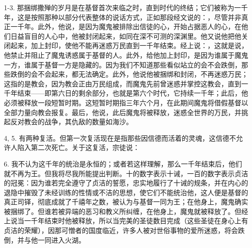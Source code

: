 1-3.  那捆绑撒殚的岁月是在基督首次来临之时，直到时代的终结；它们被称为一千年，这是按照那种以部分代表整体的说话方式，正如那段经文说的：，尽管并非真正一千年。此外，他说，是因为魔鬼被排除出信徒的心，开始占据恶人的心，在他们日益盲目的人心中，他被封闭起来，如同在深不可测的深渊里。他又说他把他关闭起来，加上封印，使他不能再迷惑万民直到一千年结束。经上说：，这就是说，他禁止并阻止了魔鬼诱惑属于基督的人。此外，给他加上封印，是因为谁属于魔鬼一方，谁属于基督一方是隐藏的。因为我们不知道那些看似站立的会不会跌倒，那些跌倒的会不会起来，都无法确定。此外，他说他被捆绑和封闭，不再迷惑万民；这指的是教会，因为教会正由万民组成，而魔鬼先前曾迷惑并掌控这教会，直到一千年结束——即第六日的剩余部分，也就是第六个时代，它持续一千年；此后，他必须被释放一段短暂时期。这短暂时期指三年六个月，在此期间魔鬼将借假基督以全部力量向教会报复。最后，他说，此后魔鬼将被释放，迷惑全世界的万民，并挑起反对教会的战争，其仇敌的数量如海沙。\par

4, 5.  有两种复活。但第一次复活现在是指那些因信德而活着的灵魂，这信德不允许人陷入第二次死亡。关于这复活，宗徒说：\par

6.  我不认为这千年的统治是永恒的；或者若这样理解，那么一千年结束后，他们就不再为王。但我将尽我所能提出判断。十的数字表示十诫，一百的数字表示贞洁的冠冕：因为谁若完全遵守了贞洁的誓愿，忠实地履行了十诫的规条，并在内心的退隐中摧毁了未经训练的性情或不洁的思想，使它们不能统治他，这人便是基督的真正司铎，彻底成就了千禧年之数，被认为与基督一同为王；在他身上，魔鬼确实被捆绑了。但谁若被异端的恶习和教义所纠缠，在他身上，魔鬼就被释放了。但经上说当一千年结束时他被释放，所以当完美的圣徒数目完成（这些圣徒在身心上有贞洁的荣耀），因那可憎者的国度临近，许多人被对世俗事物的爱所迷惑，将会跌倒，并与他一同进入火湖。\par

